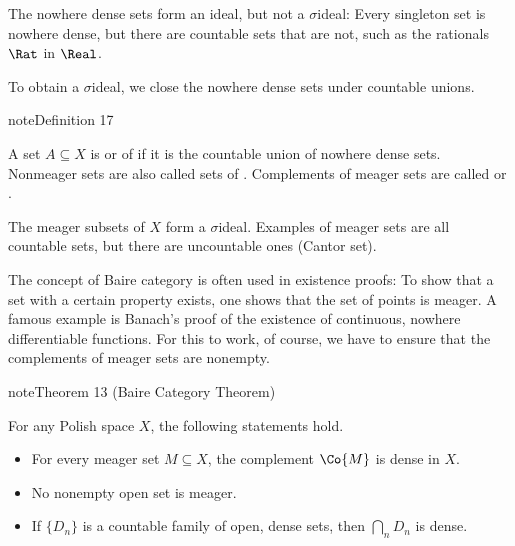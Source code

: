 \documentclass[letterpaper,10pt,english]{jupyterBook}
\begin{document}
\sphinxAtStartPar
The nowhere dense sets form an ideal, but not a \(\sigma\)\sphinxhyphen{}ideal: Every singleton set is nowhere dense, but there are countable sets that are not, such as the rationals \(\Rat\) in \(\Real\).

\sphinxAtStartPar
To obtain a \(\sigma\)\sphinxhyphen{}ideal, we close the nowhere dense sets under countable unions.
\label{measure:def-meager}
\begin{sphinxadmonition}{note}{Definition 17}



\sphinxAtStartPar
A set \(A \subseteq X\) is  or of  if it is the countable union of nowhere dense sets. Non\sphinxhyphen{}meager sets are also called sets of . Complements of meager sets are called  or .
\end{sphinxadmonition}

\sphinxAtStartPar
The meager subsets of \(X\) form a \(\sigma\)\sphinxhyphen{}ideal. Examples of meager sets are all countable sets, but there are uncountable ones (Cantor set).

\sphinxAtStartPar
The concept of Baire category is often used in existence proofs: To show that a set with a certain property exists, one shows that the set of points  is meager. A famous example is Banach’s proof of the existence of continuous, nowhere differentiable functions. For this to work, of course, we have to ensure that the complements of meager sets are non\sphinxhyphen{}empty.
\label{measure:thm-Baire-category}
\begin{sphinxadmonition}{note}{Theorem 13 (Baire Category Theorem)}



\sphinxAtStartPar
For any Polish space \(X\), the following statements hold.
\begin{itemize}
\item {} 
\sphinxAtStartPar
{} For every meager set \(M \subseteq X\), the complement \(\Co{M}\) is dense in \(X\).

\item {} 
\sphinxAtStartPar
{} No non\sphinxhyphen{}empty open set is meager.

\item {} 
\sphinxAtStartPar
{} If \(\{D_n\}\) is a countable family of open, dense sets, then  \(\bigcap_{n} D_n\) is dense.

\end{itemize}
\end{sphinxadmonition}
\end{document}
